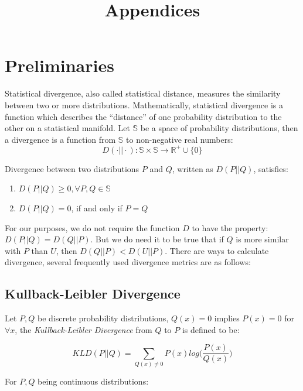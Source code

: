 \documentclass[10pt,conference,letterpaper]{article}
\title{Appendices}
\date{}
\begin{document}
	\maketitle
	
	\section{Preliminaries}\label{sec:preliminaries}
		Statistical divergence, also called statistical distance, measures the similarity between two or more distributions.
		Mathematically, statistical divergence is a function which describes the ``distance'' of one probability distribution to the other on a statistical manifold. Let $\mathbb{S}$ be a space of probability distributions, then a divergence is a function from $\mathbb{S}$ to non-negative real numbers: 
		\begin{equation}
		D(\cdot || \cdot): \mathbb{S} \times \mathbb{S} \rightarrow \mathbb{R^+} \cup \{0\}
		\end{equation}
		
		Divergence between two distributions $P$ and $Q$, written as $D(P||Q)$, satisfies:
	
		\begin{enumerate}
			\item $D(P||Q) \ge 0, \forall P, Q \in \mathbb{S}$
			\item $D(P||Q) = 0$, if and only if $P=Q$
		\end{enumerate}
		
		For our purposes, we do not require the function $D$ to have the property: $D(P||Q) = D(Q||P)$. But we do need it to be true that if $Q$ is more similar with $P$ than $U$, then $D(Q||P) < D(U||P)$. There are ways to calculate divergence,	several frequently used divergence metrics are as follows:
	
		\subsection{Kullback-Leibler Divergence}
			Let $P,Q$ be discrete probability distributions, $Q(x)=0$ implies $P(x)=0$ for $\forall x$, the \textit{Kullback-Leibler Divergence} from $Q$ to $P$ is defined to be:
			
			\begin{equation}
				KLD(P||Q) = \sum_{Q(x)\ne 0} P(x)log\Big(\frac{P(x)}{Q(x)}\Big)
			\end{equation}
			
			For $P,Q$ being continuous distributions:
			
\end{document}
